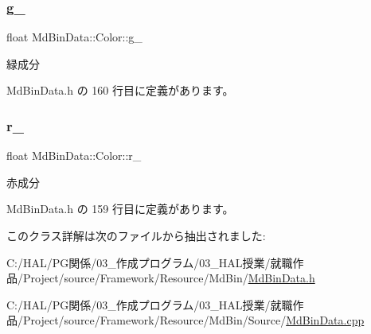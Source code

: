 \subsubsection{\texorpdfstring{g\+\_\+}{g\_}}
{\footnotesize\ttfamily float Md\+Bin\+Data\+::\+Color\+::g\+\_\+\hspace{0.3cm}{\ttfamily [private]}}



緑成分 



 Md\+Bin\+Data.\+h の 160 行目に定義があります。

\mbox{\label{class_md_bin_data_1_1_color_a86af984afebeabe57f5155c1981d9c94}} 
\subsubsection{\texorpdfstring{r\+\_\+}{r\_}}
{\footnotesize\ttfamily float Md\+Bin\+Data\+::\+Color\+::r\+\_\+\hspace{0.3cm}{\ttfamily [private]}}



赤成分 



 Md\+Bin\+Data.\+h の 159 行目に定義があります。



このクラス詳解は次のファイルから抽出されました\+:\begin{DoxyCompactItemize}
\item 
C\+:/\+H\+A\+L/\+P\+G関係/03\+\_\+作成プログラム/03\+\_\+\+H\+A\+L授業/就職作品/\+Project/source/\+Framework/\+Resource/\+Md\+Bin/\mbox{\hyperlink{_md_bin_data_8h}{Md\+Bin\+Data.\+h}}\item 
C\+:/\+H\+A\+L/\+P\+G関係/03\+\_\+作成プログラム/03\+\_\+\+H\+A\+L授業/就職作品/\+Project/source/\+Framework/\+Resource/\+Md\+Bin/\+Source/\mbox{\hyperlink{_md_bin_data_8cpp}{Md\+Bin\+Data.\+cpp}}\end{DoxyCompactItemize}
